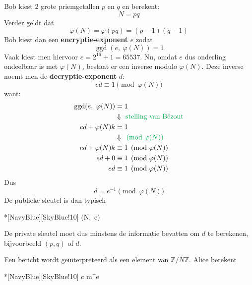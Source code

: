 Bob kiest 2 grote priemgetallen $p$ en $q$ en berekent:
\begin{equation*}
    N = pq
\end{equation*}
Verder geldt dat
\begin{equation*}
    \varphi(N) = \varphi(pq) = (p-1)(q-1)
\end{equation*}
Bob kiest dan een \textbf{encryptie-exponent} $e$ zodat
\begin{equation*}
    \operatorname{ggd}(e,\ \varphi(N)) = 1
\end{equation*}
Vaak kiest men hiervoor $e = 2^{16} + 1 = 65537$. Nu, omdat $e$ dus onderling ondeelbaar is met $\varphi(N)$, bestaat er een inverse modulo $\varphi(N)$. Deze inverse noemt men de \textbf{decryptie-exponent} $d$:
\begin{equation*}
    ed \equiv 1 \pmod {\varphi(N)}
\end{equation*}
want:
\begin{equation*}
    \begin{aligned}
        \operatorname{ggd}(e,\ \varphi(N)) &= 1 \\
        &\Downarrow \textcolor{Green}{\text{ stelling van Bézout}} \\
        ed + \varphi(N)k &= 1 \\
        &\Downarrow \textcolor{Green}{\pmod {\varphi(N)}} \\
        ed + \varphi(N)k &\equiv 1 \pmod {\varphi(N)} \\
        ed + 0 &\equiv 1 \pmod {\varphi(N)} \\
        ed &\equiv 1 \pmod {\varphi(N)}
    \end{aligned}
\end{equation*}
Dus 
\begin{equation*}
    d = e^{-1} \pmod {\varphi(N)}
\end{equation*}
De publieke sleutel is dan typisch
\begin{equationbox}*[NavyBlue][SkyBlue!10]
    (N,\ e)
\end{equationbox}
De private sleutel moet dus minstens de informatie bevatten om $d$ te berekenen, bijvoorbeeld $(p,q)$ of $d$.


Een bericht wordt geïnterpreteerd als een element van $\mathbb{Z}/N\mathbb{Z}$. Alice berekent
\begin{equationbox}*[NavyBlue][SkyBlue!10]
    c \equiv m^e 
\end{equationbox}

